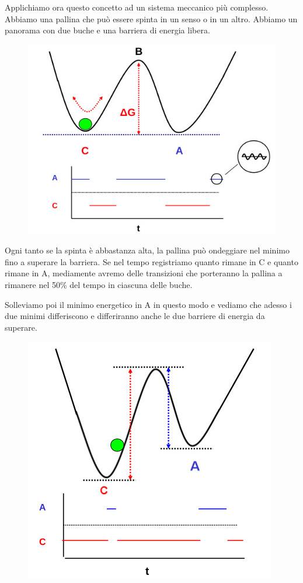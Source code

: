 \documentclass[a4paper,12pt]{article}
\begin{document}
Applichiamo ora questo concetto ad un sistema meccanico più complesso.
Abbiamo una pallina che può essere spinta in un senso o
in un altro. Abbiamo un panorama con due buche e una
barriera di energia libera. 
\begin{figure}[H]
\centering
\includegraphics[scale=0.5]{immagine/pallina.jpg}
\end{figure}

Ogni tanto se la spinta è abbastanza alta, la pallina può ondeggiare nel minimo fino a
superare la barriera.
Se nel tempo registriamo quanto rimane in C e quanto
rimane in A, mediamente avremo delle transizioni che
porteranno la pallina a rimanere nel 50\% del tempo in
ciascuna delle buche.

Solleviamo poi il minimo energetico in A in questo modo
e vediamo che adesso i due minimi differiscono e differiranno anche le due barriere di energia da superare.
\begin{figure}[H]
\centering
\includegraphics[scale=0.5]{immagine/pallina1.jpg}
\end{figure}
\end{document}
